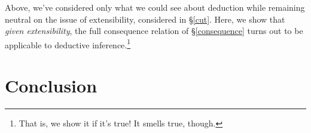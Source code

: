 \documentclass{article}
\begin{document}
Above, we've considered only what we could see about deduction while remaining neutral on the issue of extensibility, considered in \S\ref{cut}.
Here, we show that {\em given extensibility}, the full consequence relation of \S\ref{consequence} turns out to be applicable to deductive inference.\footnote{That is, we show it if it's true! It smells true, though.}


\section{Conclusion}






\end{document}
